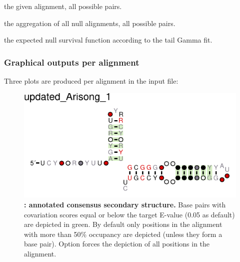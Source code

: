  \begin{sreitems}{}
 \item[\prog{First functions:}] the given alignment, all possible pairs.
 \item[\prog{Second function:}] the aggregation of all null alignments, all possible pairs.
 \item[\prog{Third function:}] the expected null survival function according to the tail Gamma fit.
 \end{sreitems}


\clearpage
\subsubsection{Graphical outputs per alignment}
 Three plots are produced per alignment in the input file: 

 \begin{figure}[h]
   \includegraphics[scale=1.5]{Arisong_R2R.pdf} 
 \caption{\small\textbf{:
     annotated consensus secondary structure.} Base pairs with
   covariation scores equal or below the target E-value (0.05 as
   default) are depicted in green. By default only positions in the
   alignment with more than 50\% occupancy are depicted (unless they form
   a base pair). Option  forces the depiction of all
   positions in the alignment.  }
 \label{fig:r2r}
 \end{figure}

